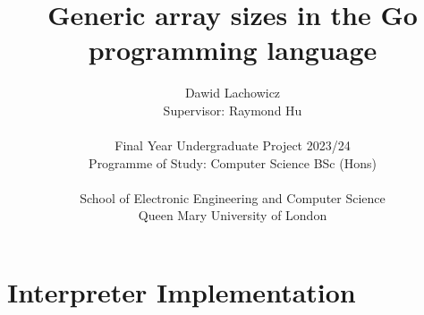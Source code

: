 \documentclass[12pt]{article}
\title{Generic array sizes in the Go programming language}
\author{
    Dawid Lachowicz \\ 
    Supervisor: Raymond Hu \\ 
    \\
    Final Year Undergraduate Project 2023/24 \\
    Programme of Study: Computer Science BSc (Hons) \\
    \\
    School of Electronic Engineering and Computer Science \\
    Queen Mary University of London
}
\begin{document}
\maketitle
\clearpage


\clearpage

\tableofcontents
\clearpage


\clearpage


\clearpage


\clearpage


\clearpage


\clearpage


\clearpage

\section{Interpreter Implementation}
\clearpage

\printbibliography
\clearpage

\appendix

\clearpage


\clearpage


\clearpage


\end{document}
